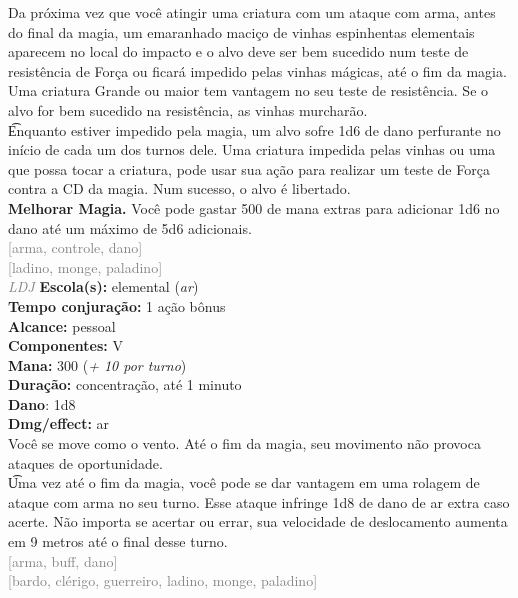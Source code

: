 \documentclass{RPG_Adventure}[2021/10/20]
\begin{document}
{\normalsize Da próxima vez que você atingir uma criatura com um ataque com arma, antes do final da magia, um emaranhado maciço de vinhas espinhentas elementais aparecem no local do impacto e o alvo deve ser bem sucedido num teste de resistência de Força ou ficará impedido pelas vinhas mágicas, até o fim da magia. Uma criatura Grande ou maior tem vantagem no seu teste de resistência. Se o alvo for bem sucedido na resistência, as vinhas murcharão.\\\t Enquanto estiver impedido pela magia, um alvo sofre 1d6 de dano perfurante no início de cada um dos turnos dele. Uma criatura impedida pelas vinhas ou uma que possa tocar a criatura, pode usar sua ação para realizar um teste de Força contra a CD da magia. Num sucesso, o alvo é libertado.\\\t \textbf{Melhorar Magia.} Você pode gastar 500 de mana extras para adicionar 1d6 no dano até um máximo de 5d6 adicionais.\\}
{\scriptsize \textcolor{gray}{[arma, controle, dano]\\}}
{\scriptsize \textcolor{gray}{[ladino, monge, paladino]\\}}
{\tiny \textcolor{gray}{\textit{LDJ}}}
{\small \t \textbf{Escola(s):} elemental (\textit{ar})\\\t \textbf{Tempo conjuração:} 1 ação bônus\\\t \textbf{Alcance:} pessoal\\\t \textbf{Componentes:} V\\\t \textbf{Mana:} 300 (\textit{+ 10 por turno})\\\t \textbf{Duração:} concentração, até 1 minuto\\\t \textbf{Dano}: 1d8\\\t \textbf{Dmg/effect:} ar\\}
{\normalsize Você se move como o vento. Até o fim da magia, seu movimento não provoca ataques de oportunidade.\\\t Uma vez até o fim da magia, você pode se dar vantagem em uma rolagem de ataque com arma no seu turno. Esse ataque infringe 1d8 de dano de ar extra caso acerte. Não importa se acertar ou errar, sua velocidade de deslocamento aumenta em 9 metros até o final desse turno.\\}
{\scriptsize \textcolor{gray}{[arma, buff, dano]\\}}
{\scriptsize \textcolor{gray}{[bardo, clérigo, guerreiro, ladino, monge, paladino]\\}}
\end{document}
